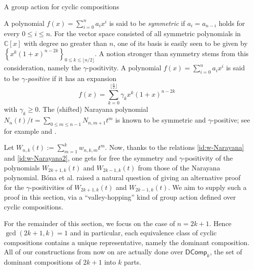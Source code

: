 \documentclass[reqno]{amsart}
\makeatletter
\numberwithin{equation}{section}
\theoremstyle{definition}
\theoremstyle{named}
\newcommand{\set}[1]{\left\{#1\right\}}
\def\section{\@startsection{section}{1}%
  \z@{.7\linespacing\@plus\linespacing}{.5\linespacing}%
  {\normalfont\scshape}}%
\newcommand{\bC}{\mathbb{C}}
\def\DComp{\mathsf{DComp}}
\makeatother
\begin{document}
\section{A group action for cyclic compositions}\label{sec:gamma}

A polynomial $f(x)=\sum_{i=0}^n a_i x^i$ is said to be {\it symmetric} if $a_i=a_{n-i}$ holds for every $0\le i\le n$. For the vector space consisted of all symmetric polynomials in $\bC[x]$ with degree no greater than $n$, one of its basis is easily seen to be given by $\set{x^k(1+x)^{n-2k}}_{0\le k\le \lfloor n/2 \rfloor}$. A notion stronger than symmetry stems from this consideration, namely the $\gamma$-positivity. A polynomial $f(x)=\sum_{i=0}^n a_i x^i$ is said to be {\it $\gamma$-positive} if it has an expansion
$$f(x)=\sum_{k=0}^{\lfloor\frac{n}{2}\rfloor}\gamma_kx^k(1+x)^{n-2k}$$ 
with $\gamma_k\ge 0$. The (shifted) Narayana polynomial $N_n(t)/t=\sum_{0\le m\le n-1}N_{n,m+1}t^m$ is known to be symmetric and $\gamma$-positive; see for example \cite[sect.~4.3]{Pet2015} and \cite{Ath2018}. 

Let $W_{n,k}(t):=\sum_{m=1}^k w_{n,k,m}t^m$. Now, thanks to the relations \eqref{id:w-Narayana} and \eqref{id:w-Narayana2}, one gets for free the symmetry and $\gamma$-positivity of the polynomials $W_{2k+1,k}(t)$ and $W_{2k-1,k}(t)$ from those of the Narayana polynomial. B\'ona et al. \cite[Remark 6.10]{BDL2022} raised a natural question of giving an alternative proof for the $\gamma$-positivities of $W_{2k+1,k}(t)$ and $W_{2k-1,k}(t)$. We aim to supply such a proof in this section, via a ``valley-hopping'' kind of group action defined over cyclic compositions. 

For the remainder of this section, we focus on the case of $n=2k+1$. Hence $\gcd(2k+1,k)=1$ and in particular, each equivalence class of cyclic compositions contains a unique representative, namely the dominant composition. All of our constructions from now on are actually done over $\DComp_k$, the set of dominant compositions of $2k+1$ into $k$ parts.

\end{document}
